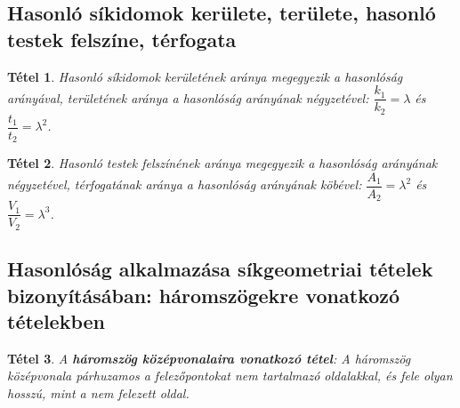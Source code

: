 \documentclass[12pt,a4paper]{article}
\newtheorem{theorem}{Tétel} [section]
\begin{document}
\subsection{Hasonló síkidomok kerülete, területe, hasonló testek felszíne, térfogata}
\begin{theorem}
Hasonló síkidomok kerületének aránya megegyezik a hasonlóság arányával, területének aránya a hasonlóság arányának négyzetével: $\dfrac{k_1}{k_2}=\lambda$ és $\dfrac{t_1}{t_2}=\lambda^2$.
\end{theorem}

\begin{theorem}
Hasonló testek felszínének aránya megegyezik a hasonlóság arányának négyzetével, térfogatának aránya a hasonlóság arányának köbével: $\dfrac{A_1}{A_2}=\lambda^2$ és $\dfrac{V_1}{V_2}=\lambda^3$.
\end{theorem}

\subsection{Hasonlóság alkalmazása síkgeometriai tételek bizonyításában: háromszögekre vonatkozó tételekben}

\begin{theorem}
A \textbf{háromszög középvonalaira vonatkozó tétel}: A háromszög középvonala párhuzamos a felezőpontokat nem tartalmazó oldalakkal, és fele olyan hosszú, mint a nem felezett oldal.
\end{theorem}
\end{document}
